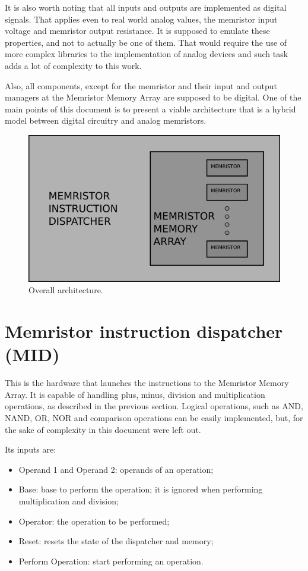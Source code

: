 \documentclass[ecp,tc,english]{iiufrgs}
\begin{document}
It is also worth noting that all inputs and outputs are implemented as digital signals. That applies even to real world analog values, the memristor input voltage and memristor output resistance. It is supposed to emulate these properties, and not to actually be one of them. That would require the use of more complex libraries to the implementation of analog devices and such task adds a lot of complexity to this work.

Also, all components, except for the memristor and their input and output managers at the Memristor Memory Array are supposed to be digital. One of the main points of this document is to present a viable architecture that is a hybrid model between digital circuitry and analog memristors.

\begin{figure}
  \caption{Overall architecture.}
  \centerline{\includegraphics{fig/arch.png}}
  \label{fig:arch}
\end{figure}

\section{Memristor instruction dispatcher (MID)}

This is the hardware that launches the instructions to the Memristor Memory Array. It is capable of handling plus, minus, division and multiplication operations, as described in the previous section. Logical operations, such as AND, NAND, OR, NOR and comparison operations can be easily implemented, but, for the sake of complexity in this document were left out.

Its inputs are:

\begin{itemize}
    \item Operand 1 and Operand 2: operands of an operation;
    \item Base: base to perform the operation; it is ignored when performing multiplication and division;
    \item Operator: the operation to be performed;
    \item Reset: resets the state of the dispatcher and memory;
    \item Perform Operation: start performing an operation.
\end{itemize}
\end{document}

